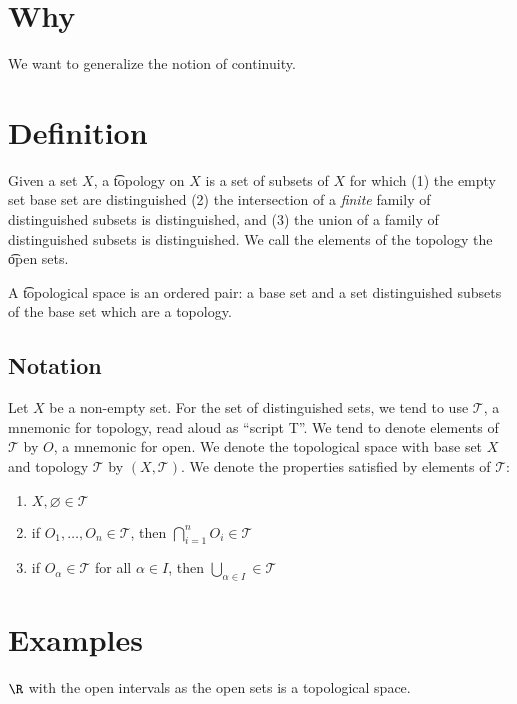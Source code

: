 
\section*{Why}

We want to generalize the notion of continuity.

\section*{Definition}

Given a set $X$, a \t{topology} on $X$ is a set of subsets of $X$ for which (1) the empty set base set are distinguished (2) the intersection of a \textit{finite} family of distinguished subsets is distinguished, and (3) the union of a family of distinguished subsets is distinguished.
We call the elements of the topology the \t{open sets}.

A \t{topological space} is an ordered pair: a base set and a set distinguished subsets of the base set which are a topology.

\subsection*{Notation}

Let $X$ be a non-empty set.
For the set of distinguished sets, we tend to use $\mathcal{T} $, a mnemonic for topology, read aloud as ``script T''.
We tend to denote elements of $\mathcal{T} $ by $O$, a mnemonic for open.
We denote the topological space with base set $X$ and topology $\mathcal{T} $ by $(X, \mathcal{T} )$.
We denote the properties satisfied by elements of $\mathcal{T} $:
    \begin{enumerate}
      \item $X, \varnothing \in \mathcal{T} $
      \item if $O_1, \dots , O_n \in \mathcal{T} $, then $\bigcap_{i = 1}^{n} O_i \in \mathcal{T} $
      \item if $O_\alpha  \in \mathcal{T} $ for all $\alpha  \in I$, then $\bigcup_{\alpha  \in I} \in \mathcal{T} $
    \end{enumerate}

\section*{Examples}

$\R $ with the open intervals as the open sets is a topological space.

